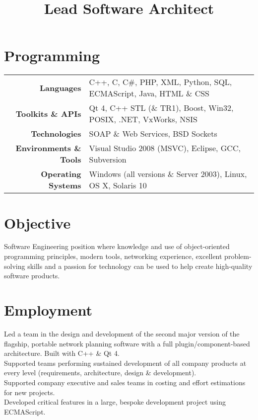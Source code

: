 \documentclass{resume}
\begin{document}
\address{22 Morse Close\\Chippenham\\SN15 3FY\\UK}
\address{lee@leegent.net\\+44 7748 183797}

\begin{resume}

\section{Programming} 
\begin{tabular}{rl}
\textbf{Languages} & C++, C, C\#, PHP, XML, Python, SQL, ECMAScript, Java, HTML \& CSS \\
\textbf{Toolkits \& APIs} & Qt 4, C++ STL (\& TR1), Boost, Win32, POSIX, .NET, VxWorks, NSIS \\
\textbf{Technologies} & SOAP \& Web Services, BSD Sockets \\
\textbf{Environments \& Tools} & Visual Studio 2008 (MSVC), Eclipse, GCC, Subversion \\
\textbf{Operating Systems} & Windows (all versions \& Server 2003), Linux, OS X, Solaris 10
\end{tabular}

\section{Objective}
Software Engineering position where knowledge and use of object-oriented programming principles, modern tools, networking experience, excellent problem-solving skills and a passion for technology can be used to help create high-quality software products.

\section{Employment}

\title{\bf{Lead Software Architect}}
\begin{position}
Led a team in the design and development of the second major version of the flagship, portable network planning software with a full plugin/component-based architecture.  Built with C++ \& Qt 4.\vspace{1mm}\\
Supported teams performing sustained development of all company products at every level (requirements, architecture, design \& development).\vspace{1mm}\\
Supported company executive and sales teams in costing and effort estimations for new projects.\vspace{1mm}\\
Developed critical features in a large, bespoke development project using ECMAScript.
\end{position}


\end{resume}
\end{document}
